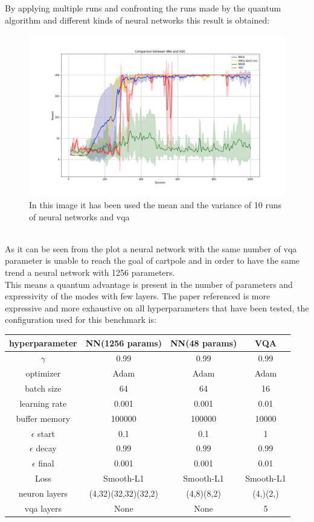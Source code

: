By applying multiple runs and confronting the runs made by the quantum algorithm and different kinds of neural networks this result is obtained:
\begin{figure}[!h]
	\centering
	\includegraphics[width=\linewidth]{img/VQCNNcomparisonmedia}
	\caption[Benchmark of quantum and classical dqn]{In this image it has been used the mean and the variance of 10 runs of neural networks and vqa}
	\label{fig:vqcnncomparisonmedia}
\end{figure}\\
As it can be seen from the plot a neural network with the same number of vqa parameter is unable to reach the goal of cartpole and in order to have the same trend a neural network with 1256 parameters.\\
This means a quantum advantage is present in the number of parameters and expressivity of the modes with few layers. The paper referenced is more expressive and more exhaustive on all hyperparameters that have been tested, the configuration used for this benchmark is:
\begin{center}
	\begin{tabular}{|c|c|c|c|}
		\hline
		hyperparameter & NN(1256 params) & NN(48 params) & VQA \\
		\hline
		$\gamma$ & 0.99 & 0.99 & 0.99 \\
		\hline
		optimizer & Adam & Adam & Adam \\
		\hline
		batch size & 64 & 64  & 16 \\
		\hline
		learning rate & 0.001 & 0.001 & 0.01 \\
		\hline
		buffer memory & 100000 & 100000 & 10000 \\
		\hline
		$\epsilon$ start & 0.1 & 0.1 & 1 \\
		\hline
		$\epsilon$ decay & 0.99 & 0.99 & 0.99 \\
		\hline
		$\epsilon$ final & 0.001 & 0.001 & 0.01 \\
		\hline
		Loss & Smooth-L1 & Smooth-L1 & Smooth-L1 \\
		\hline
		neuron layers & (4,32)(32,32)(32,2) & (4,8)(8,2) & (4,)(2,)  \\
		\hline
		vqa layers & None & None & 5 \\
		\hline
	\end{tabular}
\end{center}
